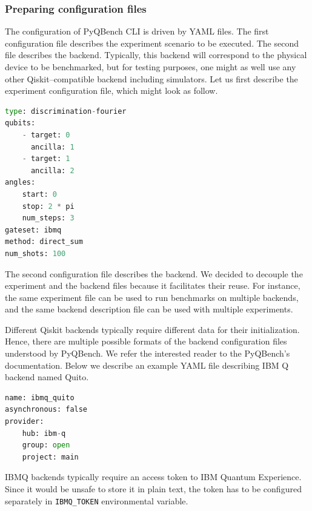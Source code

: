 \documentclass[preprint,12pt, a4paper, dvipsnames]{elsarticle}
\newcommand{\1}{{\rm 1\hspace{-0.9mm}l}}
\theoremstyle{definition}
\begin{document}
\subsubsection{Preparing configuration files}
The configuration of PyQBench CLI is driven by YAML files. The first configuration file describes
the experiment scenario to be executed. The second file describes the backend. Typically, this
backend will correspond to the physical device to be benchmarked, but for testing purposes, one
might as well use any other Qiskit--compatible backend including simulators. Let us first describe
the experiment configuration file, which might look as follow.
\begin{lstlisting}[language=Python, caption=Defining the experiment, label=lst:experiment]
type: discrimination-fourier
qubits:
	- target: 0
	  ancilla: 1
	- target: 1
      ancilla: 2
angles:
	start: 0
	stop: 2 * pi
	num_steps: 3
gateset: ibmq
method: direct_sum
num_shots: 100
\end{lstlisting}

The second configuration file describes the backend. We decided to decouple the experiment and the
backend files because it facilitates their reuse. For instance, the same experiment file can be used
to run benchmarks on multiple backends, and the same backend description file can be used with
multiple experiments.

Different Qiskit backends typically require different data for their initialization. Hence, there
are multiple possible formats of the backend configuration files understood by PyQBench. We refer
the interested reader to the PyQBench's documentation. Below we describe an example YAML file
describing IBM Q backend named Quito.
\begin{lstlisting}[language=Python, caption=IBMQ backend, label=lst:backend]
name: ibmq_quito
asynchronous: false
provider:
	hub: ibm-q
	group: open
	project: main
\end{lstlisting}
IBMQ backends typically require an access token to IBM Quantum Experience. Since it would be unsafe
to store it in plain text, the token has to be configured separately in \texttt{IBMQ\_TOKEN}
environmental variable.
\end{document}
